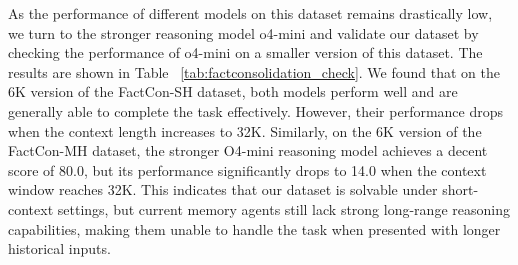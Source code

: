 \begin{table} 
    \centering
    \vspace{-12pt}
    \caption{Performances of reasoning models on the dataset FactConsolidation.}
\label{tab:factconsolidation_check}
\vspace{-10pt}
\end{table}

As the performance of different models on this dataset
remains drastically low, we turn to the stronger reasoning model o4-mini and validate our dataset by checking the performance of o4-mini on a smaller version
of this dataset. The results are shown in Table ~\ref{tab:factconsolidation_check}.  We found that on the 6K version of the FactCon-SH dataset, both models perform well and are generally able to complete the task effectively. However, their performance drops when the context length increases to 32K. Similarly, on the 6K version of the FactCon-MH dataset, the stronger O4-mini reasoning model achieves a decent score of 80.0, but its performance significantly drops to 14.0 when the context window reaches 32K. This indicates that our dataset is solvable under short-context settings, but current memory agents still lack strong long-range reasoning capabilities, making them unable to handle the task when presented with longer historical inputs.

